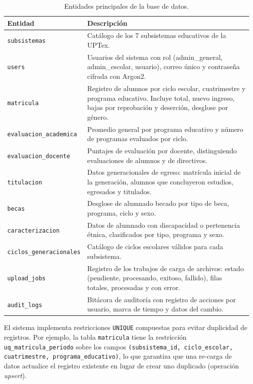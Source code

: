 \begin{table}[H]
\centering
\begin{tabular}{|l|p{8.5cm}|}
\hline
\textbf{Entidad} & \textbf{Descripción} \\
\hline
\texttt{subsistemas} & Catálogo de los 7 subsistemas educativos de la UPTex. \\
\hline
\texttt{users} & Usuarios del sistema con rol (admin\_general, admin\_escolar, usuario), correo único y contraseña cifrada con Argon2. \\
\hline
\texttt{matricula} & Registro de alumnos por ciclo escolar, cuatrimestre y programa educativo. Incluye total, nuevo ingreso, bajas por reprobación y deserción, desglose por género. \\
\hline
\texttt{evaluacion\_academica} & Promedio general por programa educativo y número de programas evaluados por ciclo. \\
\hline
\texttt{evaluacion\_docente} & Puntajes de evaluación por docente, distinguiendo evaluaciones de alumnos y de directivos. \\
\hline
\texttt{titulacion} & Datos generacionales de egreso: matrícula inicial de la generación, alumnos que concluyeron estudios, egresados y titulados. \\
\hline
\texttt{becas} & Desglose de alumnado becado por tipo de beca, programa, ciclo y sexo. \\
\hline
\texttt{caracterizacion} & Datos de alumnado con discapacidad o pertenencia étnica, clasificados por tipo, programa y sexo. \\
\hline
\texttt{ciclos\_generacionales} & Catálogo de ciclos escolares válidos para cada subsistema. \\
\hline
\texttt{upload\_jobs} & Registro de los trabajos de carga de archivos: estado (pendiente, procesando, exitoso, fallido), filas totales, procesadas y con error. \\
\hline
\texttt{audit\_logs} & Bitácora de auditoría con registro de acciones por usuario, marca de tiempo y datos del cambio. \\
\hline
\end{tabular}
\caption{Entidades principales de la base de datos.}
\end{table}

El sistema implementa restricciones \texttt{UNIQUE} compuestas para evitar duplicidad de registros. Por ejemplo, la tabla \texttt{matricula} tiene la restricción \texttt{uq\_matricula\_periodo} sobre los campos \texttt{(subsistema\_id, ciclo\_escolar, cuatrimestre, programa\_educativo)}, lo que garantiza que una re-carga de datos actualice el registro existente en lugar de crear uno duplicado (operación \textit{upsert}).

